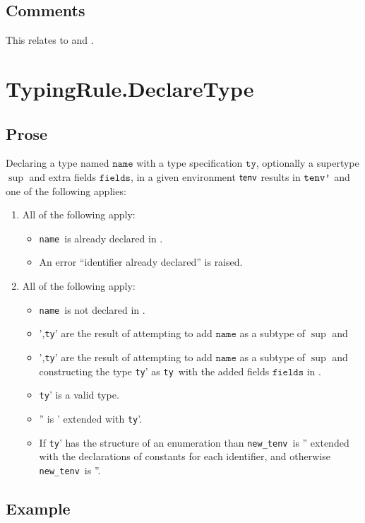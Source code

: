 \documentclass{book}
\newcommand\newtenv[0]{\texttt{new\_tenv}}
\newcommand\tty[0]{\texttt{ty}}
\newcommand\fields[0]{\texttt{fields}}
\newcommand\name[0]{\texttt{name}}
\begin{document}
\subsection{Comments}
This relates to  and .

\section{TypingRule.DeclareType \label{sec:TypingRule.DeclareType}}
\subsection{Prose}
Declaring a type named $\name$ with a type specification $\tty$,
optionally a supertype $\sup$ and extra fields $\fields$, in a given environment $\textsf{tenv}$ results
in $\texttt{tenv'}$ and one of the following applies:
\begin{enumerate}
  \item All of the following apply:
  \begin{itemize}
    \item \name\ is already declared in \tenv.
    \item An error ``identifier already declared'' is raised.
  \end{itemize}
  \item All of the following apply:
  \begin{itemize}
    \item \name\ is not declared in \tenv.
    \item  \tenv',\tty' are the result of attempting to add $\name$ as a subtype of $\sup$ and
    \item  \tenv',\tty' are the result of attempting to add $\name$ as a subtype of $\sup$ and
    constructing the type \tty' as \tty\ with the added fields $\fields$ in \tenv.
    \item \tty' is a valid type.
    \item \tenv'' is \tenv' extended with \tty'.
    \item If \tty' has the structure of an enumeration than \newtenv\ is \tenv'' extended with the declarations of constants for each identifier,
    and otherwise \newtenv\ is \tenv''.
  \end{itemize}
\end{enumerate}

\subsection{Example}
\end{document}
